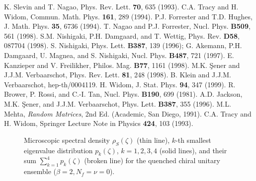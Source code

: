 \begin{references}
K. Slevin and T. Nagao,
Phys. Rev. Lett. {\bf 70}, 635 (1993).
C.A. Tracy and H. Widom,
Commun. Math. Phys. {\bf 161}, 289 (1994).
P.J. Forrester and T.D. Hughes,
J. Math. Phys. {\bf 35}, 6736 (1994).
T. Nagao and P.J. Forrester,
Nucl. Phys. {\bf B509}, 561 (1998).
S.M. Nishigaki, P.H. Damgaard, and T. Wettig,
Phys. Rev. {\bf D58}, 087704 (1998).
S. Nishigaki, Phys. Lett. {\bf B387}, 139 (1996);
\newline
G. Akemann, P.H. Damgaard, U. Magnea, and S. Nishigaki,
Nucl. Phys. {\bf B487}, 721 (1997).
E. Kanzieper and V. Freilikher,
Philos. Mag. {\bf B77}, 1161 (1998).
M.K. \c{S}ener and J.J.M. Verbaarschot, Phys. Rev. Lett. {\bf 81},
248 (1998).\newline
B. Klein and J.J.M. Verbaarschot,  hep-th/0004119.
H. Widom, J. Stat. Phys. {\bf 94}, 347 (1999).
R. Brower, P. Rossi, and C.-I. Tan, Nucl. Phys. {\bf B190},
699 (1981).\newline  
A.D. Jackson, M.K. \c{S}ener, and J.J.M. Verbaarschot,
Phys. Lett. {\bf B387}, 355 (1996).
M.L. Mehta, 
{\it Random Matrices}, 2nd Ed. (Academic, San Diego, 1991).
C.A. Tracy and H. Widom,
Springer Lecture Note in Physics {\bf 424}, 103 (1993).
\end{references}
\widetext
\Lrule
\begin{figure}
\epsfxsize=320pt
  \begin{center}
    \leavevmode
{} 
  \end{center}
\caption{
Microscopic spectral density
$\rho_S(\zeta)$ (thin line),
$k$-th smallest eigenvalue distribution
$p_k(\zeta)$, $k=1, 2, 3, 4$ (solid lines), and their sum
$\sum_{k=1}^4 p_k(\zeta)$ (broken line)
for the quenched chiral unitary ensemble ($\beta=2, N_f=\nu=0$).
}
\end{figure}
